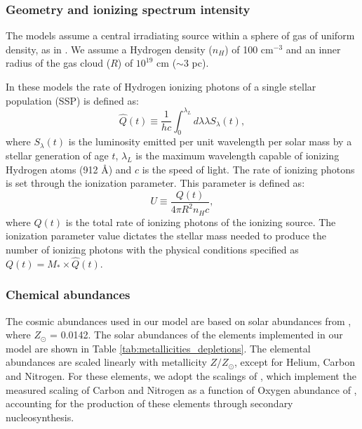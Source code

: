 \documentclass[fleqn,usenatbib]{mnras}
\begin{document}
\subsubsection{Geometry and ionizing spectrum intensity}
The models assume a central irradiating source within a sphere of gas of uniform density, as in \cite{byler2017}. We assume a Hydrogen density ($n_H$) of 100 cm$^{-3}$ and an inner radius of the gas cloud ($R$) of $10^{19}$ cm ($\sim 3$ pc). 

In these models the rate of Hydrogen ionizing photons of a single stellar population (SSP) is defined as:
\begin{equation}
    \hat{Q}(t) \equiv \frac{1}{hc} \int_0^{\lambda_L} d\lambda \lambda S_{\lambda}(t) ,
\end{equation}
where $S_{\lambda}(t)$ is the luminosity emitted per unit wavelength per solar mass by a stellar generation of age $t$, $\lambda_{L}$ is the maximum wavelength capable of ionizing Hydrogen atoms (912 \AA) and $c$ is the speed of light. The rate of ionizing photons is set through the ionization parameter. This parameter is defined as:
\begin{equation}
    U \equiv \frac{Q(t)}{4 \pi R^2 n_H c},
\end{equation}
where $Q(t)$ is the total rate of ionizing photons of the ionizing source. The ionization parameter value dictates the stellar mass needed to produce the number of ionizing photons with the physical conditions specified as $Q(t) = M_* \times \hat{Q}(t)$.

\subsubsection{Chemical abundances}
The cosmic abundances used in our model are based on solar abundances from \cite{grevesse2010}, where $Z_{\odot}$ = 0.0142. The solar abundances of the elements implemented in our model are shown in Table \ref{tab:metallicities_depletions}. The elemental abundances are scaled linearly with metallicity $Z/Z_{\odot}$, except for Helium, Carbon and Nitrogen. For these elements, we adopt the scalings of \cite{dopita2013}, which implement the measured scaling of Carbon and Nitrogen as a function of Oxygen abundance of \cite{vanzee1998}, accounting for the production of these elements through secondary nucleosynthesis.
\end{document}
